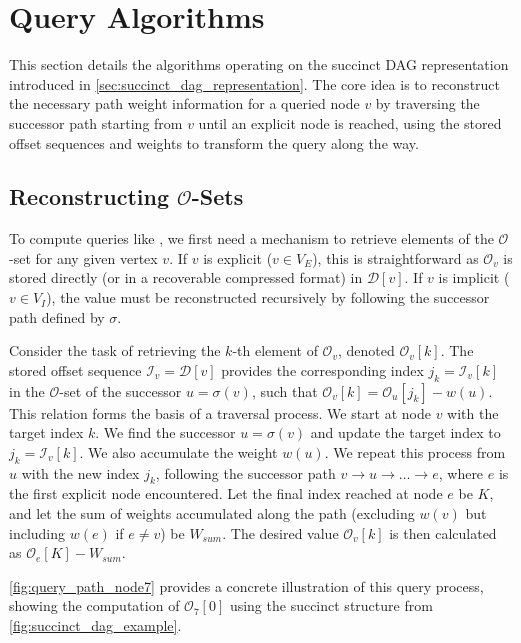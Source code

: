 \section{Query Algorithms}
\label{sec:query_algorithms}

This section details the algorithms operating on the succinct DAG representation introduced in \autoref{sec:succinct_dag_representation}. The core idea is to reconstruct the necessary path weight information for a queried node $v$ by traversing the successor path starting from $v$ until an explicit node is reached, using the stored offset sequences and weights to transform the query along the way.

\subsection{Reconstructing $\mathcal{O}$-Sets}
\label{subsec:reconstructing_o_sets}

To compute queries like \Rank{}, we first need a mechanism to retrieve elements of the $\mathcal{O}$-set for any given vertex $v$. If $v$ is explicit ($v \in V_E$), this is straightforward as $\mathcal{O}_v$ is stored directly (or in a recoverable compressed format) in $\mathcal{D}[v]$. If $v$ is implicit ($v \in V_I$), the value must be reconstructed recursively by following the successor path defined by $\sigma$.

Consider the task of retrieving the $k$-th element of $\mathcal{O}_v$, denoted $\mathcal{O}_v[k]$. The stored offset sequence $\mathcal{I}_v = \mathcal{D}[v]$ provides the corresponding index $j_k = \mathcal{I}_v[k]$ in the $\mathcal{O}$-set of the successor $u = \sigma(v)$, such that $\mathcal{O}_v[k] = \mathcal{O}_u[j_k] - w(u)$. This relation forms the basis of a traversal process. We start at node $v$ with the target index $k$. We find the successor $u=\sigma(v)$ and update the target index to $j_k = \mathcal{I}_v[k]$. We also accumulate the weight $w(u)$. We repeat this process from $u$ with the new index $j_k$, following the successor path $v \to u \to \dots \to e$, where $e$ is the first explicit node encountered. Let the final index reached at node $e$ be $K$, and let the sum of weights accumulated along the path (excluding $w(v)$ but including $w(e)$ if $e \ne v$) be $W_{sum}$. The desired value $\mathcal{O}_v[k]$ is then calculated as $\mathcal{O}_e[K] - W_{sum}$.

\autoref{fig:query_path_node7} provides a concrete illustration of this query process, showing the computation of $\mathcal{O}_7[0]$ using the succinct structure from \autoref{fig:succinct_dag_example}.

